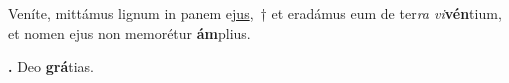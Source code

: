 
Veníte, mittámus lignum in panem e\underline{jus},~† et eradámus eum de ter\textit{ra vi}\textbf{vén}tium, et nomen ejus non memorétur \textbf{ám}plius.

\textbf{\Rbar.} Deo \textbf{grá}tias.

